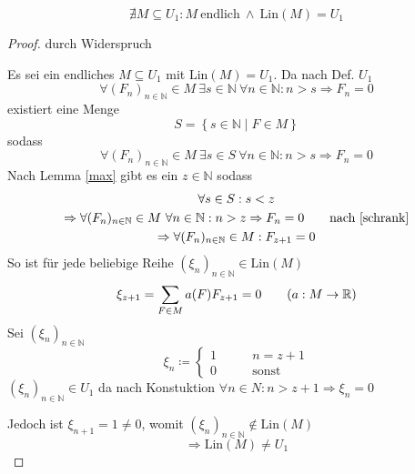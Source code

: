 \documentclass[a4paper, 12pt]{scrartcl}
\begin{document}
\begin{theorem}
\[ \nexists M \subseteq U_1 : M\ \text{endlich}\ \wedge\ \mathrm{Lin}(M) = U_1 \]
\end{theorem}
\begin{proof}
durch Widerspruch

Es sei ein endliches $M \subseteq U_1$ mit $\mathrm{Lin}(M) = U_1$. Da nach Def. $U_1$
\[ \forall (F_n)_{n \in \mathbb{N}} \in M\ \exists s \in \mathbb{N}\ \forall n \in \mathbb{N} : n > s \Rightarrow F_n = 0 \]
existiert eine Menge
\[ S = \left\{ s \in \mathbb{N} \mid F \in M \right\} \]
sodass
\begin{equation}\label{schrank}
	\forall (F_n)_{n \in \mathbb{N}} \in M\ \exists s \in S\ \forall n \in \mathbb{N} : n > s \Rightarrow F_n = 0
\end{equation}
\newpage
Nach Lemma \ref{max} gibt es ein $z \in \mathbb{N}$ sodass
\begin{gather*}
	\forall s \in S : s < z \\
	\Rightarrow \forall (F_n)_{n \in \mathbb{N}} \in M\ \forall n \in \mathbb{N} : n > z \Rightarrow F_n = 0 \tag*{nach \eqref{schrank}} \\
	\Rightarrow \forall (F_n)_{n \in \mathbb{N}} \in M : F_{z+1} = 0
\end{gather*}
So ist für jede beliebige Reihe $(\xi_n)_{n \in \mathbb{N}} \in \mathrm{Lin}(M)$
\[ \xi_{z+1} = \sum_{F \in M} a(F)F_{z+1} = 0 \tag{$a:M \rightarrow \mathbb{R}$} \]
Sei $(\xi_n)_{n \in \mathbb{N}}$
\[ \xi_n \coloneqq \begin{cases}
	1 &\qquad n = z+1 \\
	0 &\qquad \text{sonst}
\end{cases} \]
$(\xi_n)_{n \in \mathbb{N}} \in U_1$ da nach Konstuktion $\forall n \in N : n > z+1 \Rightarrow \xi_n = 0$

Jedoch ist $\xi_{n+1} = 1 \neq 0$, womit $(\xi_n)_{n \in \mathbb{N}} \notin \mathrm{Lin}(M)$
\[ \Rightarrow \mathrm{Lin}(M) \neq U_1 \]
\end{proof}
\end{document}
